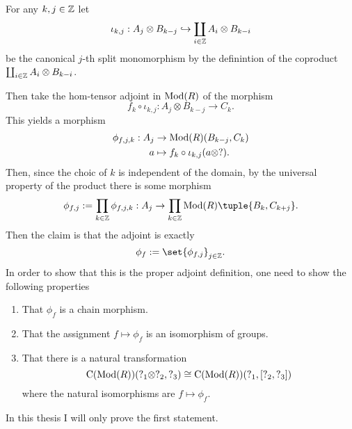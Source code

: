 \begin{remark}
\begin{center}
    \end{center}

    For any \( k, j \in {\mathbb{Z}} \) let
    \[
        \iota_{k, j}: A_j \otimes B_{k - j} \hookrightarrow \coprod_{i \in {\mathbb{Z}}} A_i \otimes B_{k - i}
    \]
    be the canonical \( j \)-th split monomorphism by the definintion of the coproduct \( \coprod_{i \in {\mathbb{Z}}} A_i \otimes B_{k - i} \).

    Then take the hom-tensor adjoint in \( \operatorname{Mod}(R) \) of the morphism
    \[
        f_k \circ \iota_{k, j}: A_j \otimes B_{k - j} \to C_k.
    \]
    This yields a morphism
    \begin{align*}
        \phi_{f, j, k}: A_j &\to \operatorname{Mod}(R)(B_{k - j}, C_k) \\
        a &\mapsto f_k \circ \iota_{k, j}(a \otimes ?).
    \end{align*}
    Then, since the choic of \( k \) is independent of the domain, by the universal property of the product there is some morphism
    \[
        \phi_{f, j} := \prod_{k \in \Zb} \phi_{f, j, k}: A_j \to \prod_{k \in \Zb} \Mod(R)\tuple{B_k, C_{k + j}}.
    \]
    Then the claim is that the adjoint is exactly
    \[
        \phi_f := \set{\phi_{f, j}}_{j \in \Zb}.
    \]
    In order to show that this is the proper adjoint definition, one need to show the following properties
    \begin{enumerate}
        \item {
            That \( \phi_f \) is a chain morphism.
        }
        \item {
            That the assignment \( f \mapsto \phi_f \) is an isomorphism of groups.
        }
        \item {
            That there is a natural transformation
            \[
                \operatorname{C}(\operatorname{Mod}(R))(?_1 \otimes ?_2, ?_3) \cong \operatorname{C}(\operatorname{Mod}(R))(?_1, \left[ ?_2, ?_3 \right])
            \]
            where the natural isomorphisms are \( f \mapsto \phi_f \).
        }
    \end{enumerate}
    In this thesis I will only prove the first statement.


\end{remark}
